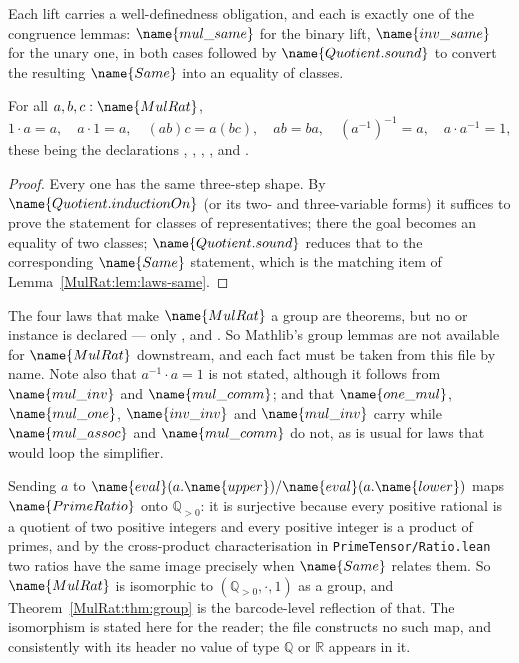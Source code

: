 Each lift carries a well-definedness obligation, and each is exactly one of
the congruence lemmas: $\name{mul\_same}$ for the binary lift,
$\name{inv\_same}$ for the unary one, in both cases followed by
$\name{Quotient.sound}$ to convert the resulting $\name{Same}$ into an
equality of classes.

\begin{theorem}\label{MulRat:thm:group}
For all $a, b, c : \name{MulRat}$,
\[
  1 \cdot a = a, \quad
  a \cdot 1 = a, \quad
  (ab)c = a(bc), \quad
  ab = ba, \quad
  (a^{-1})^{-1} = a, \quad
  a \cdot a^{-1} = 1,
\]
these being the declarations , ,
, ,  and .
\end{theorem}

\begin{proof}
Every one has the same three-step shape.  By $\name{Quotient.inductionOn}$
(or its two- and three-variable forms) it suffices to prove the statement for
classes of representatives; there the goal becomes an equality of two classes;
$\name{Quotient.sound}$ reduces that to the corresponding $\name{Same}$
statement, which is the matching item of Lemma~\ref{MulRat:lem:laws-same}.
\end{proof}

\begin{remark}\label{MulRat:rem:instances}
The four laws that make $\name{MulRat}$ a group are theorems, but no
 or  instance is declared --- only ,
 and .  So Mathlib's group lemmas are not available for
$\name{MulRat}$ downstream, and each fact must be taken from this file by
name.  Note also that $a^{-1} \cdot a = 1$ is not stated, although it follows
from $\name{mul\_inv}$ and $\name{mul\_comm}$; and that
$\name{one\_mul}$, $\name{mul\_one}$, $\name{inv\_inv}$ and $\name{mul\_inv}$
carry  while $\name{mul\_assoc}$ and $\name{mul\_comm}$ do not,
as is usual for laws that would loop the simplifier.
\end{remark}

\begin{remark}\label{MulRat:rem:iso}
Sending $a$ to
$\name{eval}(a.\name{upper}) / \name{eval}(a.\name{lower})$ maps
$\name{PrimeRatio}$ onto $\mathbb{Q}_{>0}$: it is surjective because every
positive rational is a quotient of two positive integers and every positive
integer is a product of primes, and by the cross-product characterisation in
\texttt{PrimeTensor/Ratio.lean} two ratios have the same image precisely when
$\name{Same}$ relates them.  So $\name{MulRat}$ is isomorphic to
$(\mathbb{Q}_{>0}, \cdot, 1)$ as a group, and
Theorem~\ref{MulRat:thm:group} is the barcode-level reflection of that.  The
isomorphism is stated here for the reader; the file constructs no such map,
and consistently with its header no value of type $\mathbb{Q}$ or $\mathbb{R}$
appears in it.
\end{remark}

